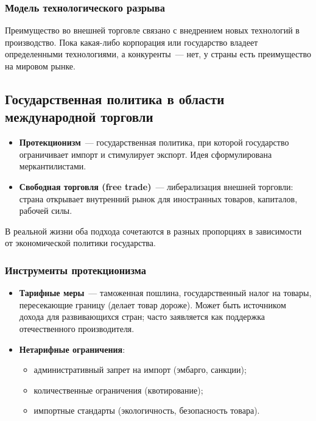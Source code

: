 \documentclass[12pt]{article}
\begin{document}
    \subsubsection{Модель технологического разрыва}
    
    \begin{person}[Познер]
    	Преимущество во внешней торговле связано с внедрением новых технологий в производство. Пока какая-либо корпорация или государство владеет определенными технологиями, а конкуренты~--- нет, у страны есть преимущество на мировом рынке.
    \end{person}
    
    \subsection{Государственная политика в области международной торговли}
    
    \begin{itemize}
    	\item \textbf{Протекционизм}~--- государственная политика, при которой государство ограничивает импорт и стимулирует экспорт. Идея сформулирована меркантилистами.
    	\item \textbf{Свободная торговля (free trade)}~--- либерализация внешней торговли: страна открывает внутренний рынок для иностранных товаров, капиталов, рабочей силы.
    \end{itemize}
    
    \noindent
    В реальной жизни оба подхода сочетаются в разных пропорциях в зависимости от экономической политики государства.
    
    \subsubsection{Инструменты протекционизма}
    
    \begin{itemize}
    	\item \textbf{Тарифные меры}~--- таможенная пошлина, государственный налог на товары, пересекающие границу (делает товар дороже). Может быть источником дохода для развивающихся стран; часто заявляется как поддержка отечественного производителя.
    	\item \textbf{Нетарифные ограничения}:
    	\begin{itemize}
    		\item административный запрет на импорт (эмбарго, санкции);
    		\item количественные ограничения (квотирование);
    		\item импортные стандарты (экологичность, безопасность товара).
    	\end{itemize}
    \end{itemize}
    
\end{document}
